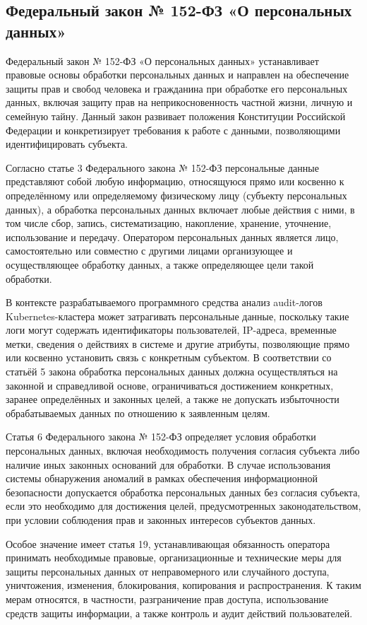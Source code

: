 \subsection{Федеральный закон № 152-ФЗ «О персональных данных»}

Федеральный закон № 152-ФЗ «О персональных данных» \cite{FZ152} устанавливает правовые основы обработки персональных данных и направлен на обеспечение защиты прав и свобод человека и гражданина при обработке его персональных данных, включая защиту прав на неприкосновенность частной жизни, личную и семейную тайну. Данный закон развивает положения Конституции Российской Федерации и конкретизирует требования к работе с данными, позволяющими идентифицировать субъекта.

Согласно статье 3 Федерального закона № 152-ФЗ персональные данные представляют собой любую информацию, относящуюся прямо или косвенно к определённому или определяемому физическому лицу (субъекту персональных данных), а обработка персональных данных включает любые действия с ними, в том числе сбор, запись, систематизацию, накопление, хранение, уточнение, использование и передачу. Оператором персональных данных является лицо, самостоятельно или совместно с другими лицами организующее и осуществляющее обработку данных, а также определяющее цели такой обработки.

В контексте разрабатываемого программного средства анализ audit-логов Kubernetes-кластера может затрагивать персональные данные, поскольку такие логи могут содержать идентификаторы пользователей, IP-адреса, временные метки, сведения о действиях в системе и другие атрибуты, позволяющие прямо или косвенно установить связь с конкретным субъектом. В соответствии со статьёй 5 закона обработка персональных данных должна осуществляться на законной и справедливой основе, ограничиваться достижением конкретных, заранее определённых и законных целей, а также не допускать избыточности обрабатываемых данных по отношению к заявленным целям.

Статья 6 Федерального закона № 152-ФЗ определяет условия обработки персональных данных, включая необходимость получения согласия субъекта либо наличие иных законных оснований для обработки. В случае использования системы обнаружения аномалий в рамках обеспечения информационной безопасности допускается обработка персональных данных без согласия субъекта, если это необходимо для достижения целей, предусмотренных законодательством, при условии соблюдения прав и законных интересов субъектов данных.

Особое значение имеет статья 19, устанавливающая обязанность оператора принимать необходимые правовые, организационные и технические меры для защиты персональных данных от неправомерного или случайного доступа, уничтожения, изменения, блокирования, копирования и распространения. К таким мерам относятся, в частности, разграничение прав доступа, использование средств защиты информации, а также контроль и аудит действий пользователей.

